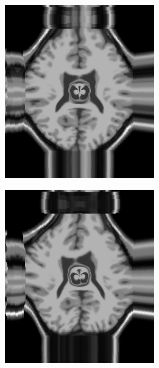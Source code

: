 \begin{figure}[H]
\begin{subfigure}[t]{0.25\textwidth}
	  \includegraphics[width=\textwidth]{figuras/resultDist.png}
	  \label{fig:dist-image-tps}
	\end{subfigure}
	\begin{subfigure}[t]{0.25\textwidth}
	  \includegraphics[width=\textwidth]{figuras/resultDistSin.png}

\end{subfigure}
\end{figure}
